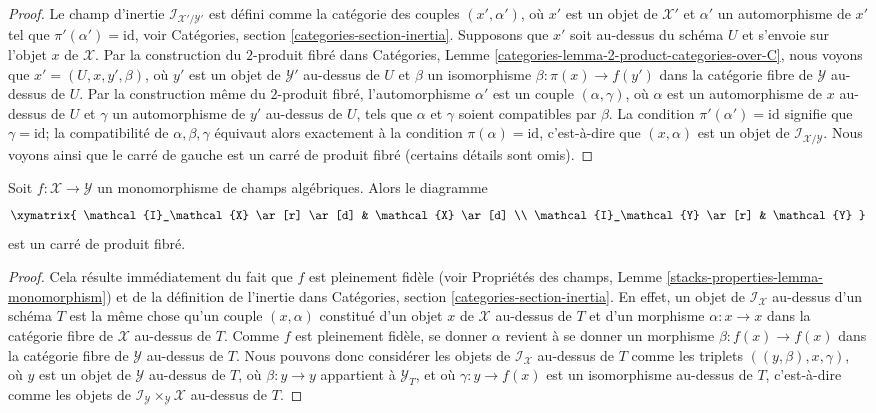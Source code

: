 \begin{proof}
Le champ d'inertie $\mathcal{I}_{\mathcal{X}'/\mathcal{Y}'}$ est défini
comme la catégorie des couples $(x', \alpha')$, où $x'$ est un objet de
$\mathcal{X}'$ et $\alpha'$ un automorphisme de $x'$ tel que
$\pi'(\alpha') = \text{id}$, voir Catégories, section
\ref{categories-section-inertia}. Supposons que $x'$ soit au-dessus du
schéma $U$ et s'envoie sur l'objet $x$ de $\mathcal{X}$. Par la construction
du $2$-produit fibré dans Catégories, Lemme
\ref{categories-lemma-2-product-categories-over-C}, nous voyons que
$x' = (U, x, y', \beta)$, où $y'$ est un objet de $\mathcal{Y}'$ au-dessus
de $U$ et $\beta$ un isomorphisme
$\beta : \pi(x) \to f(y')$ dans la catégorie fibre de $\mathcal{Y}$
au-dessus de $U$. Par la construction même du $2$-produit fibré,
l'automorphisme $\alpha'$ est un couple $(\alpha, \gamma)$, où $\alpha$ est
un automorphisme de $x$ au-dessus de $U$ et $\gamma$ un automorphisme de
$y'$ au-dessus de $U$, tels que $\alpha$ et $\gamma$ soient compatibles par
$\beta$. La condition $\pi'(\alpha') = \text{id}$ signifie que
$\gamma = \text{id}$; la compatibilité de $\alpha, \beta, \gamma$ équivaut
alors exactement à la condition $\pi(\alpha) = \text{id}$, c'est-à-dire que
$(x, \alpha)$ est un objet de $\mathcal{I}_{\mathcal{X}/\mathcal{Y}}$.
Nous voyons ainsi que le carré de gauche est un carré de produit fibré
(certains détails sont omis).
\end{proof}

\begin{lemma}
\label{lemma-monomorphism-cartesian-square-inertia}
Soit $f : \mathcal{X} \to \mathcal{Y}$ un monomorphisme de champs
algébriques. Alors le diagramme
$$
\xymatrix{
\mathcal{I}_\mathcal{X} \ar[r] \ar[d] &
\mathcal{X} \ar[d] \\
\mathcal{I}_\mathcal{Y} \ar[r] &
\mathcal{Y}
}
$$
est un carré de produit fibré.
\end{lemma}

\begin{proof}
Cela résulte immédiatement du fait que $f$ est pleinement fidèle (voir
Propriétés des champs, Lemme
\ref{stacks-properties-lemma-monomorphism}) et de la définition de l'inertie
dans Catégories, section \ref{categories-section-inertia}. En effet, un objet
de $\mathcal{I}_\mathcal{X}$ au-dessus d'un schéma $T$ est la même chose
qu'un couple $(x, \alpha)$ constitué d'un objet $x$ de $\mathcal{X}$
au-dessus de $T$ et d'un morphisme $\alpha : x \to x$ dans la catégorie
fibre de $\mathcal{X}$ au-dessus de $T$. Comme $f$ est pleinement fidèle,
se donner $\alpha$ revient à se donner un morphisme
$\beta : f(x) \to f(x)$ dans la catégorie fibre de $\mathcal{Y}$ au-dessus
de $T$. Nous pouvons donc considérer les objets de
$\mathcal{I}_\mathcal{X}$ au-dessus de $T$ comme les triplets
$((y, \beta), x, \gamma)$, où $y$ est un objet de $\mathcal{Y}$ au-dessus
de $T$, où $\beta : y \to y$ appartient à $\mathcal{Y}_T$, et où
$\gamma : y \to f(x)$ est un isomorphisme au-dessus de $T$, c'est-à-dire
comme les objets de $\mathcal{I}_\mathcal{Y} \times_\mathcal{Y}
\mathcal{X}$ au-dessus de $T$.
\end{proof}

